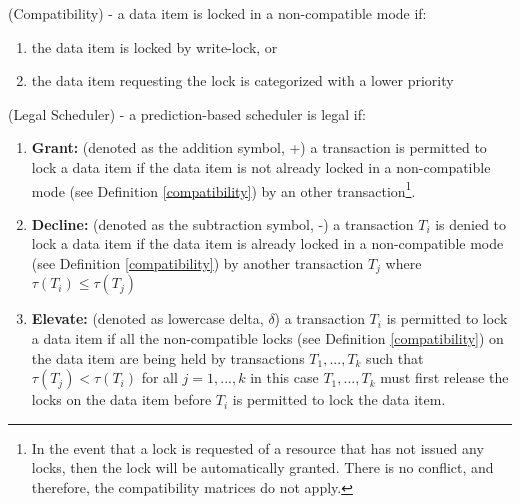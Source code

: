 
\begin{definition}
\label{compatibility}
(Compatibility) - a data item is locked in a non-compatible mode if:

\begin{enumerate}
  \item the data item is locked by write-lock, or
  \item the data item requesting the lock is categorized with a lower priority
\end{enumerate}
\end{definition}

\begin{definition}
\label{legal_scheduler}
 (Legal Scheduler) - a prediction-based scheduler is legal if:
 
 \begin{enumerate}
    \item \textbf{Grant:} (denoted as the addition symbol, +) a transaction is permitted to lock a data item if the data item is not already locked in a non-compatible mode (see Definition \ref{compatibility}) by an other transaction\footnote{In the event that a lock is requested of a resource that has not issued any locks, then the lock will be automatically granted. There is no conflict, and therefore, the compatibility matrices do not apply.}.
    \item \textbf{Decline:} (denoted as the subtraction symbol, -) a transaction $T_{i}$ is denied to lock a data item if the data item is already locked in a non-compatible mode (see Definition \ref{compatibility}) by another transaction $T_{j}$ where $\tau(T_{i}) \le \tau(T_{j})$
    \item \textbf{Elevate:} (denoted as lowercase delta, $\delta$) a transaction $T_{i}$ is permitted to lock a data item if all the non-compatible locks (see Definition \ref{compatibility}) on the data item are being held by transactions $T_{1}, ... , T_{k}$ such that $\tau(T_{j}) < \tau(T_{i})$ for all $j = 1, ..., k$ in this case $T_{1}, ... , T_{k}$ must first release the locks on the data item before $T_{i}$ is permitted to lock the data item.
 \end{enumerate}

 

\end{definition}

